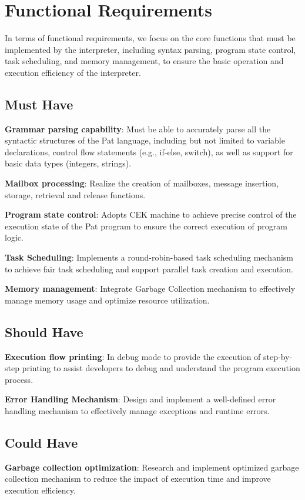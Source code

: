 \documentclass{l4proj}
\begin{document}
\section{Functional Requirements}
In terms of functional requirements, we focus on the core functions that must be implemented by the interpreter, including syntax parsing, program state control, task scheduling, and memory management, to ensure the basic operation and execution efficiency of the interpreter.

\subsection{Must Have}
\textbf{Grammar parsing capability}: Must be able to accurately parse all the syntactic structures of the Pat language, including but not limited to variable declarations, control flow statements (e.g., if-else, switch), as well as support for basic data types (integers, strings).

\textbf{Mailbox processing}: Realize the creation of mailboxes, message insertion, storage, retrieval and release functions.

\textbf{Program state control}: Adopts CEK machine to achieve precise control of the execution state of the Pat program to ensure the correct execution of program logic.

\textbf{Task Scheduling}: Implements a round-robin-based task scheduling mechanism to achieve fair task scheduling and support parallel task creation and execution.

\textbf{Memory management}: Integrate Garbage Collection mechanism to effectively manage memory usage and optimize resource utilization.

\subsection{Should Have}
\textbf{Execution flow printing}: In debug mode to provide the execution of step-by-step printing to assist developers to debug and understand the program execution process.

\textbf{Error Handling Mechanism}: Design and implement a well-defined error handling mechanism to effectively manage exceptions and runtime errors.

\subsection{Could Have}
\textbf{Garbage collection optimization}: Research and implement optimized garbage collection mechanism to reduce the impact of execution time and improve execution efficiency.
\end{document}
